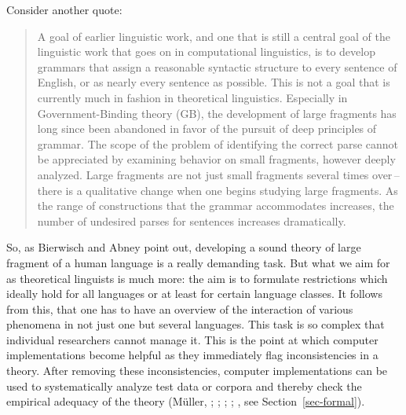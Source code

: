 Consider another quote:
\begin{quote}
A goal of earlier linguistic work, and one that is still a central goal of the
linguistic work that goes on in computational linguistics, is to develop grammars
that assign a reasonable syntactic structure to every sentence of English,
or as nearly every sentence as possible. This is not a goal that is currently much
in fashion in theoretical linguistics. Especially in Government-Binding theory
(GB), the development of large fragments has long since been abandoned in
favor of the pursuit of deep principles of grammar.
The scope of the problem of identifying the correct parse cannot be appreciated
by examining behavior on small fragments, however deeply analyzed.
Large fragments are not just small fragments several times over\,--\,there is a
qualitative change when one begins studying large fragments. As the range of
constructions that the grammar accommodates increases, the number of undesired parses for sentences
increases dramatically. \citep[]{Abney96a}
\end{quote}
%
So, as Bierwisch and Abney point out, developing a sound theory of large fragment of a human
language is a really demanding task. But what we aim for as theoretical linguists is much more: the aim is to formulate restrictions which ideally hold for all languages or at least
for certain language classes. It follows from this, that one has to have an overview of the interaction of various phenomena in
not just one but several languages. This task is so complex that individual researchers cannot manage it. This is
the point at which computer implementations become helpful as they immediately flag inconsistencies in a theory. 
After removing these inconsistencies, computer implementations can be used to systematically analyze test data
or corpora and thereby check the empirical adequacy of the theory
(Müller, \citeyear[Chapter~22]{Mueller99a}; \citeyear{MuellerCoreGram}; \citeyear{MuellerKernigkeit}; \citealp{OF98}; \citealp{Bender2008c}, see Section~\ref{sec-formal}).


